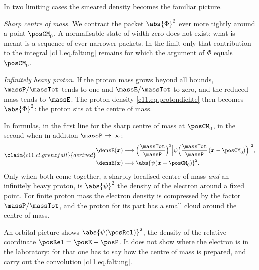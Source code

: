 In two limiting cases the smeared density becomes the familiar picture.

\emph{Sharp centre of mass.} We contract the packet $\abs{\Phi}^2$ ever more tightly
around a point $\posCM_0$. A normalisable state of width zero does not exist; what is
meant is a sequence of ever narrower packets. In the limit only that contribution to the
integral \eqref{c11.eq.faltung} remains for which the argument of $\Phi$ equals
$\posCM_0$.

\emph{Infinitely heavy proton.} If the proton mass grows beyond all bounds,
$\massP/\massTot$ tends to one and $\massE/\massTot$ to zero, and the reduced mass
tends to $\massE$. The proton density \eqref{c11.eq.protondichte} then becomes
$\abs{\Phi}^2$: the proton sits at the centre of mass.

In formulas, in the first line for the sharp centre of mass at $\posCM_0$, in the second
when in addition $\massP \to \infty$:
\begin{equation}\label{c11.eq.grenzfall}\claim{c11.cl.grenzfall}{derived}
  \begin{aligned}
    \densE(\boldsymbol{x})
    &\longrightarrow \Bigl(\frac{\massTot}{\massP}\Bigr)^{3}
      \Bigl\lvert \psi\Bigl(\frac{\massTot}{\massP}\,(\boldsymbol{x} - \posCM_0)\Bigr)
      \Bigr\rvert^2, \\
    \densE(\boldsymbol{x})
    &\longrightarrow \abs{\psi(\boldsymbol{x} - \posCM_0)}^2 .
  \end{aligned}
\end{equation}
Only when both come together, a sharply localised centre of mass \emph{and} an infinitely
heavy proton, is $\abs{\psi}^2$ the density of the electron around a fixed point. For
finite proton mass the electron density is compressed by the factor $\massP/\massTot$,
and the proton for its part has a small cloud around the centre of mass.

\begin{merksatz}
  An orbital picture shows $\abs{\psi(\posRel)}^2$, the density of the relative
  coordinate $\posRel = \posE - \posP$. It does not show where the electron is in the
  laboratory: for that one has to say how the centre of mass is prepared, and carry out
  the convolution \eqref{c11.eq.faltung}.
\end{merksatz}

